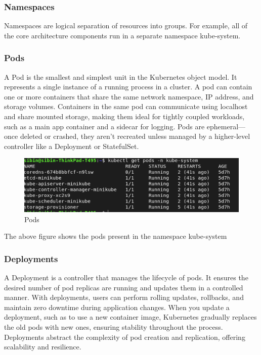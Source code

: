 \subsubsection{Namespaces}
Namespaces are logical separation of resources into groups. For example, all of the core architecture components run in a separate namespace kube-system.

\subsubsection{Pods}
A Pod is the smallest and simplest unit in the Kubernetes object model. It represents a single instance of a running process in a cluster. A pod can contain one or more containers that share the same network namespace, IP address, and storage volumes. Containers in the same pod can communicate using localhost and share mounted storage, making them ideal for tightly coupled workloads, such as a main app container and a sidecar for logging. Pods are ephemeral—once deleted or crashed, they aren't recreated unless managed by a higher-level controller like a Deployment or StatefulSet.


\begin{figure}[H]
\caption{Pods}
\centering
\includegraphics[width=1\textwidth]{SOA/k8s-components.png}
\end{figure}

The above figure shows the pods present in the namespace kube-system

\subsubsection{Deployments}
A Deployment is a controller that manages the lifecycle of pods. It ensures the desired number of pod replicas are running and updates them in a controlled manner. With deployments, users can perform rolling updates, rollbacks, and maintain zero downtime during application changes. When you update a deployment, such as to use a new container image, Kubernetes gradually replaces the old pods with new ones, ensuring stability throughout the process. Deployments abstract the complexity of pod creation and replication, offering scalability and resilience.


